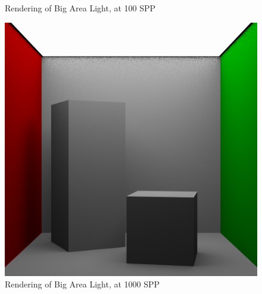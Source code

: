 \documentclass[a4paper]{myarticle}
\begin{document}
\begin{figure}[H]
\begin{minipage}[t]{.3\textwidth}
      \caption{Rendering of Big Area Light, at 100 SPP}
  \end{minipage}
  \hfill
  \begin{minipage}[t]{.3\textwidth}
      \centering
      \includegraphics[width=\textwidth]{q3/big_2_1000.png}
      \caption{Rendering of Big Area Light, at 1000 SPP}
  \end{minipage}
\end{figure}
\end{document}
